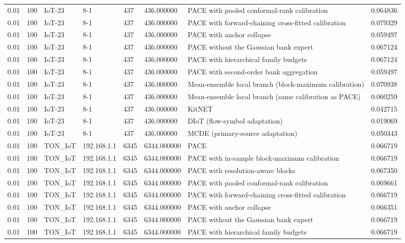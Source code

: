 \begin{tabular}{llllllll}
0.01 & 100 & IoT-23 & 8-1 & 437 & 436.000000 & PACE with pooled conformal-rank calibration & 0.064836 \\
0.01 & 100 & IoT-23 & 8-1 & 437 & 436.000000 & PACE with forward-chaining cross-fitted calibration & 0.079329 \\
0.01 & 100 & IoT-23 & 8-1 & 437 & 436.000000 & PACE with anchor collapse & 0.059497 \\
0.01 & 100 & IoT-23 & 8-1 & 437 & 436.000000 & PACE without the Gaussian bank expert & 0.067124 \\
0.01 & 100 & IoT-23 & 8-1 & 437 & 436.000000 & PACE with hierarchical family budgets & 0.067124 \\
0.01 & 100 & IoT-23 & 8-1 & 437 & 436.000000 & PACE with second-order bank aggregation & 0.059497 \\
0.01 & 100 & IoT-23 & 8-1 & 437 & 436.000000 & Mean-ensemble local branch (block-maximum calibration) & 0.070938 \\
0.01 & 100 & IoT-23 & 8-1 & 437 & 436.000000 & Mean-ensemble local branch (same calibration as PACE) & 0.060259 \\
0.01 & 100 & IoT-23 & 8-1 & 437 & 436.000000 & KitNET & 0.042715 \\
0.01 & 100 & IoT-23 & 8-1 & 437 & 436.000000 & DIoT (flow-symbol adaptation) & 0.019069 \\
0.01 & 100 & IoT-23 & 8-1 & 437 & 436.000000 & MCDE (primary-source adaptation) & 0.050343 \\
0.01 & 100 & TON\_IoT & 192.168.1.1 & 6345 & 6344.000000 & PACE & 0.066719 \\
0.01 & 100 & TON\_IoT & 192.168.1.1 & 6345 & 6344.000000 & PACE with in-sample block-maximum calibration & 0.066719 \\
0.01 & 100 & TON\_IoT & 192.168.1.1 & 6345 & 6344.000000 & PACE with resolution-aware blocks & 0.067350 \\
0.01 & 100 & TON\_IoT & 192.168.1.1 & 6345 & 6344.000000 & PACE with pooled conformal-rank calibration & 0.069661 \\
0.01 & 100 & TON\_IoT & 192.168.1.1 & 6345 & 6344.000000 & PACE with forward-chaining cross-fitted calibration & 0.066719 \\
0.01 & 100 & TON\_IoT & 192.168.1.1 & 6345 & 6344.000000 & PACE with anchor collapse & 0.066351 \\
0.01 & 100 & TON\_IoT & 192.168.1.1 & 6345 & 6344.000000 & PACE without the Gaussian bank expert & 0.066719 \\
0.01 & 100 & TON\_IoT & 192.168.1.1 & 6345 & 6344.000000 & PACE with hierarchical family budgets & 0.066719 \\

\end{tabular}
